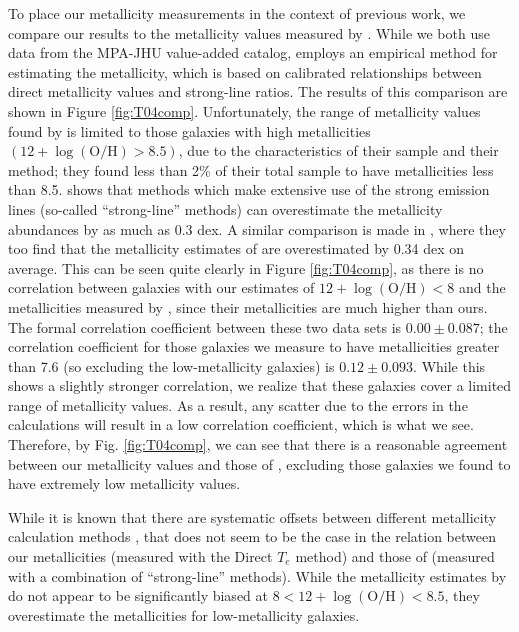 To place our metallicity measurements in the context of previous work, we 
compare our results to the metallicity values measured by \cite{Tremonti04}.  
While we both use data from the MPA-JHU value-added catalog, \cite{Tremonti04} 
employs an empirical method for estimating the metallicity, which is based on 
calibrated relationships between direct metallicity values and strong-line 
ratios.  The results of this comparison are shown in Figure \ref{fig:T04comp}.  
Unfortunately, the range of metallicity values found by \cite{Tremonti04} is 
limited to those galaxies with high metallicities 
$(12 + \log(\text{O}/\text{H}) > 8.5)$, due to the characteristics of their 
sample and their method; they found less than 2\% of their total sample to have 
metallicities less than 8.5.  \cite{Kennicutt03} shows that methods which make 
extensive use of the strong emission lines (so-called ``strong-line'' methods) 
can overestimate the metallicity abundances by as much as 0.3 dex.  A similar 
comparison is made in \cite{Yin07}, where they too find that the metallicity 
estimates of \cite{Tremonti04} are overestimated by 0.34 dex on average.  This 
can be seen quite clearly in Figure \ref{fig:T04comp}, as there is no 
correlation between galaxies with our estimates of 
$12 + \log (\text{O}/\text{H}) < 8$ and the metallicities measured by 
\cite{Tremonti04}, since their metallicities are much higher than ours.  The 
formal correlation coefficient between these two data sets is $0.00 \pm 0.087$; 
the correlation coefficient for those galaxies we measure to have metallicities 
greater than 7.6 (so excluding the low-metallicity galaxies) is 
$0.12 \pm 0.093$.  While this shows a slightly stronger correlation, we realize 
that these galaxies cover a limited range of metallicity values.  As a result, 
any scatter due to the errors in the calculations will result in a low 
correlation coefficient, which is what we see.  Therefore, by Fig. 
\ref{fig:T04comp}, we can see that there is a reasonable agreement between our 
metallicity values and those of \cite{Tremonti04}, excluding those galaxies we 
found to have extremely low metallicity values.

While it is known that there are systematic offsets between different 
metallicity calculation methods \citep{Kewley08}, that does not seem to be the 
case in the relation between our metallicities (measured with the Direct $T_e$ 
method) and those of \cite{Tremonti04} (measured with a combination of 
``strong-line'' methods).  While the metallicity estimates by \cite{Tremonti04} 
do not appear to be significantly biased at 
$8 < 12 + \log (\text{O}/\text{H}) < 8.5$, they overestimate the metallicities 
for low-metallicity galaxies.

